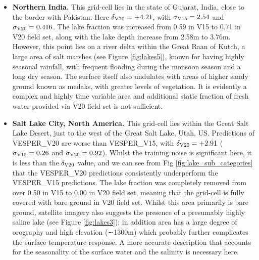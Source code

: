 \documentclass[hess, twostagejnl]{copernicus}
\begin{document}
\begin{itemize}
	
		\item \textbf{Northern India.} This grid-cell lies in the state of Gujarat, India, close to the border with Pakistan. Here $\delta_{\rm V20} = +4.21$, with $\sigma_{\rm V15} = 2.54$ and $\sigma_{\rm V20}=0.416$. The lake fraction was increased from 0.59 in V15 to 0.71 in V20 field set, along with the lake depth increase from 2.58m to 3.76m. However, this point lies on a river delta within the Great Raan of Kutch, a large area of salt marshes (see Figure \ref{fig:lakes5}), known for having highly seasonal rainfall, with frequent flooding during the monsoon season and a long dry season. The surface itself also undulates with areas of higher sandy ground known as medaks, with greater levels of vegetation. It is evidently a complex and highly time variable area and additional static fraction of fresh water provided via V20 field set is not sufficient.
	
	\item \textbf{Salt Lake City, North America.} This grid-cell lies within the Great Salt Lake Desert, just to the west of the Great Salt Lake, Utah, US. Predictions of VESPER\_V20 are worse than VESPER\_V15, with $\delta_{\rm V20} = +2.91$ ($\sigma_{\rm V15} = 0.26$ and $\sigma_{\rm V20}=0.92$). Whilst the training noise is significant here, it is less than the $\delta_{\rm V20}$ value, and we can see from Fig \ref{fig:lake_sub_categories} that the VESPER\_V20 predictions consistently underperform the VESPER\_V15 predictions. The lake fraction was completely removed from over 0.50 in V15 to 0.00 in V20 field set, meaning that the grid-cell is fully covered with bare ground in V20 field set. Whilst this area primarily is bare ground, satellite imagery also suggests the presence of a presumably highly saline lake (see Figure \ref{fig:lakes3}); in addition area has a large degree of orography and high elevation (∼1300m) which probably further complicates the surface temperature response. A more accurate description that accounts for the seasonality of the surface water and the salinity is necessary here.
	

\end{itemize}
\end{document}
